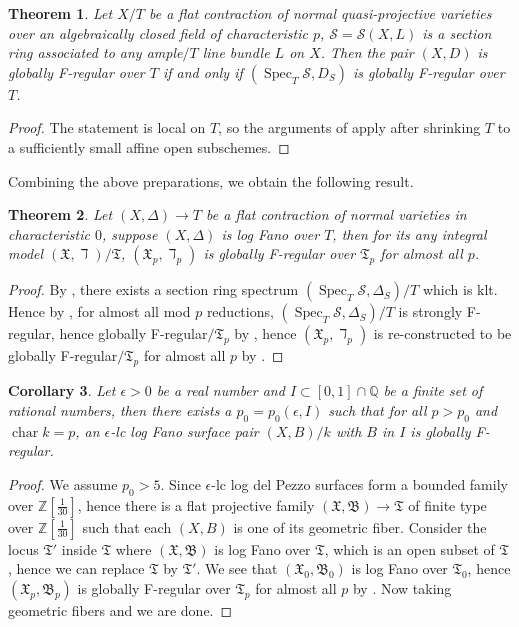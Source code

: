 \documentclass[letterpaper,reqno,12pt]{amsart}
\DeclareMathOperator{\Spec}{Spec}
\DeclareMathOperator{\chara}{char}
\numberwithin{equation}{section}
\theoremstyle{plain}
\newtheorem{theorem}{Theorem}[section]
\newtheorem{corollary}[theorem]{Corollary}
\begin{document}
\begin{theorem}\label{affgfr}
    Let $X/T$ be a flat contraction of normal quasi-projective varieties over an algebraically closed field of characteristic $p$, $\mathcal S=\mathcal S(X,L)$ is a section ring associated to any ample$/T$ line bundle $L$ on $X$. Then the pair $(X,D)$ is globally F-regular over $T$ if and only if $(\Spec_T\mathcal S,D_S)$ is globally F-regular over $T$.
\end{theorem}
\begin{proof}
    The statement is local on $T$, so the arguments of \cite[5.3]{SS09} apply after shrinking $T$ to a sufficiently small affine open subschemes.
\end{proof}
Combining the above preparations, we obtain the following result.
\begin{theorem}\label{relgfr}
    Let $(X,\Delta)\to T$ be a flat contraction of normal varieties in characteristic $0$, suppose $(X,\Delta)$ is log Fano over $T$, then for its any integral model $(\mathfrak X,\daleth)/\mathfrak T$, $(\mathfrak X_p,\daleth_p)$ is globally F-regular over $\mathfrak T_p$ for almost all $p$. 
\end{theorem}
\begin{proof}
    By , there exists a section ring spectrum $(\Spec_T\mathcal S,\Delta_S)/T$ which is klt. Hence by \cite[3.4]{tak04}, for almost all mod $p$ reductions, $(\Spec_T\mathcal S,\Delta_S)/T$ is strongly F-regular, hence globally F-regular$/\mathfrak T_p$ by , hence $(\mathfrak X_p,\daleth_p)$ is re-constructed to be globally F-regular$/\mathfrak T_p$ for almost all $p$ by .
\end{proof}
\begin{corollary}\label{gengfr}
    Let $\epsilon>0$ be a real number and $I\subset [0,1]\cap \mathbb Q$ be a finite set of rational numbers, then there exists a $p_0=p_0(\epsilon,I)$ such that for all $p>p_0$ and $\chara k=p$, an $\epsilon$-lc log Fano surface pair $(X,B)/k$ with $B$ in $I$ is globally F-regular.
\end{corollary}
\begin{proof}
    We assume $p_0>5$. Since $\epsilon$-lc log del Pezzo surfaces form a bounded family over $\mathbb Z[\frac{1}{30}]$, hence there is a flat projective family $(\mathfrak X,\mathfrak B)\to \mathfrak T$ of finite type over $\mathbb Z[\frac{1}{30}]$ such that each $(X,B)$ is one of its geometric fiber. Consider the locus $\mathfrak T'$ inside $\mathfrak T$ where $(\mathfrak X,\mathfrak B)$ is log Fano over $\mathfrak T$, which is an open subset of $\mathfrak T$, hence we can replace $\mathfrak T$ by $\mathfrak T'$. We see that $(\mathfrak X_0,\mathfrak B_0)$ is log Fano over $\mathfrak T_0$, hence $(\mathfrak X_p,\mathfrak B_p)$ is globally F-regular over $\mathfrak T_p$ for almost all $p$ by . Now taking geometric fibers and we are done.
\end{proof}
\end{document}
